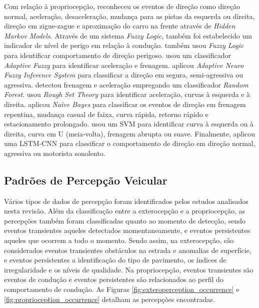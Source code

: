 Com relação à propriocepção,  reconheceu os eventos de direção como direção normal, aceleração, desaceleração, mudança para as pistas da esquerda ou direita, direção em zigue-zague e aproximação do carro na frente através de \textit{Hidden Markov
Models}. Através de um sistema \textit{Fuzzy Logic}, também foi estabelecido um indicador de nível de perigo em relação à condução.  também usou \textit{Fuzzy Logic} para identificar comportamento de direção perigoso.  usou um classificador \textit{Adaptive Fuzzy} para identificar aceleração e frenagem.  aplicou \textit{Adaptive Neuro Fuzzy Inference System} para classificar a direção em segura, semi-agressiva ou agressiva.  detectou frenagem e aceleração empregando um classificador \textit{Random Forest}.  usou \textit{Rough Set Theory} para identificar aceleração, curvas à esquerda e à direita.  aplicou \textit{Naïve Bayes} para classificar os eventos de direção em frenagem repentina, mudança casual de faixa, curva rápida, retorno rápido e estacionamento prolongado.  usou um SVM para identificar curva à esquerda ou à direita, curva em U (meia-volta), frenagem abrupta ou suave. Finalmente,  aplicou uma LSTM-CNN para classificar o comportamento de direção em direção normal, agressiva ou motorista sonolento.

\subsection{Padrões de Percepção Veicular}

Vários tipos de dados de percepção foram identificados pelos estudos analisados nesta revisão. Além da classificação entre a exterocepção e a propriocepção, as percepções também foram classificadas quanto ao momento de detecção, sendo eventos transientes aqueles detectados momentaneamente, e eventos persistentes aqueles que ocorrem a todo o momento. 
Sendo assim, na exterocepção, são considerados eventos transientes obstáculos na estrada e anomalias de superfície, e eventos persistentes a identificação do tipo de pavimento, os índices de irregularidade e os níveis de qualidade. Na propriocepção, eventos transientes são eventos de condução e eventos persistentes são relacionados ao perfil do comportamento de condução. 
As Figuras \ref{fig:exteroperception_occurrence} e \ref{fig:proprioception_occurrence} detalham as percepções encontradas.

